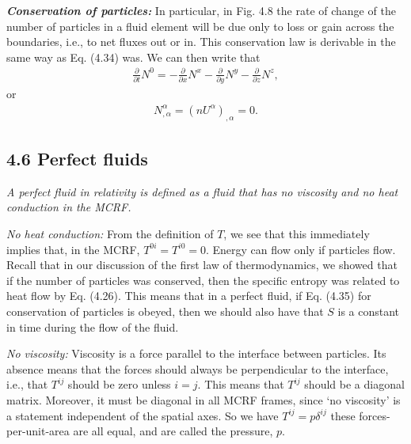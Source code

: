 \documentclass[11pt,letterpaper]{book}
\begin{document}
    \textbf{\textit{Conservation of particles:}}
    In particular, in Fig. 4.8 the rate of change of the number of particles in a fluid element will be due only to loss or gain across the boundaries, i.e., to net fluxes out or in. This conservation law is derivable in the same way as Eq. (4.34) was. We can then write that
    \begin{align}
    \frac{\partial}{\partial t} N^0 = - \frac{\partial}{\partial x} N^x - \frac{\partial}{\partial y} N^y - \frac{\partial}{\partial z} N^z,
    \end{align}
    or
    \begin{align}
    N^{\alpha}_{,\alpha} = (n U^\alpha)_{,\alpha} = 0. \tag{4.35}
    \end{align}

    \subsection{4.6 Perfect fluids}

    \textit{A perfect fluid in relativity is defined as a fluid that has no viscosity and no heat conduction in the MCRF.}

    \textit{No heat conduction:} From the definition of \(T\), we see that this immediately implies that, in the MCRF, \(T^{0i} = T^{i0} = 0\). Energy can flow only if particles flow. Recall that in our discussion of the first law of thermodynamics, we showed that if the number of particles was conserved, then the specific entropy was related to heat flow by Eq. (4.26). This means that in a perfect fluid, if Eq. (4.35) for conservation of particles is obeyed, then we should also have that \(S\) is a constant in time during the flow of the fluid.

    \textit{No viscosity:} Viscosity is a force parallel to the interface between particles. Its absence means that the forces should always be perpendicular to the interface, i.e., that \(T^{ij}\) should be zero unless \(i = j\). This means that \(T^{ij}\) should be a diagonal matrix. Moreover, it must be diagonal in all MCRF frames, since ‘no viscosity’ is a statement independent of the spatial axes. So we have \(T^{ij} = p \delta^{ij}\) these forces-per-unit-area are all equal, and are called the pressure, \(p\).
\end{document}
